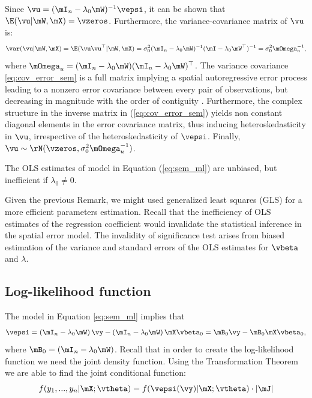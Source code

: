 Since $\vu = (\mI_n - \lambda_0\mW)^{-1}\vepsi$, it can be shown that $\E(\vu| \mW, \mX) = \vzeros$. Furthermore, the variance-covariance matrix of $\vu$ is: 
\begin{equation}\label{eq:cov_error_sem}
\var(\vu| \mW, \mX)=\E(\vu\vu^\top| \mW, \mX) = \sigma^2_0(\mI_n-\lambda_0\mW)^{-1}(\mI-\lambda_0\mW^\top)^{-1}=\sigma^2_0\mOmega_{u}^{-1},
\end{equation}
%
where $\mOmega_{u}=(\mI_n-\lambda_0\mW)(\mI_n-\lambda_0\mW)^\top$. The variance covariance \eqref{eq:cov_error_sem} is a full matrix implying a spatial autoregressive error process leading to a nonzero error covariance between every pair of observations, but decreasing in magnitude with the order of contiguity \citep{AnselinBera1998}. Furthermore, the complex structure in the inverse matrix in (\ref{eq:cov_error_sem}) yields non constant diagonal elements in the error covariance matrix, thus inducing heteroskedasticity in $\vu$, irrespective of the heteroskedasticity of $\vepsi$. Finally, $\vu \sim \rN(\vzeros, \sigma^2_0\mOmega_u^{-1})$.

\begin{remark}\label{remark:ols_sem}
  The OLS estimates of model in Equation (\ref{eq:sem_ml}) are unbiased, but inefficient if $\lambda_0 \neq 0$.
\end{remark}

Given the previous Remark, we might used generalized least squares (GLS) for a more efficient parameters estimation. Recall that the inefficiency of OLS estimates of the regression coefficient would invalidate the statistical inference in the spatial error model. The invalidity of significance test arises from biased estimation of the variance and standard errors of the OLS estimates for $\vbeta$ and $\lambda$.

\subsection{Log-likelihood function}

The model in Equation \eqref{eq:sem_ml} implies that
\begin{equation*}
\vepsi = \left(\mI_n-\lambda_0\mW\right)\vy - \left(\mI_n-\lambda_0\mW\right)\mX\vbeta_0 = \mB_0\vy - \mB_0\mX\vbeta_0,
\end{equation*}
%
where $\mB_0 = (\mI_n-\lambda_0\mW)$. Recall that in order to create the log-likelihood function we need the joint density function. Using the Transformation Theorem we are able to find the joint conditional function:
\begin{equation*}
  f(y_1,...,y_n|\mX; \vtheta) = f(\vepsi(\vy)| \mX ; \vtheta) \cdot \left|\mJ\right|
\end{equation*}

